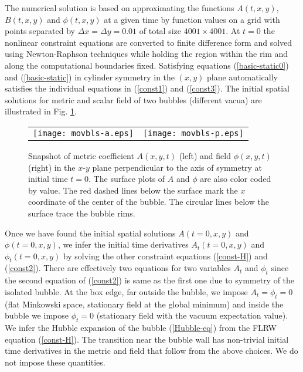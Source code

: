 \documentclass[preprintnumbers,eqsecnum,aps,prd,epsf,showpacs,nofootinbib
]{revtex4}
\begin{document}
The numerical solution is based on approximating the functions
$A(t,x,y)$, $B(t,x,y)$ and $\phi(t,x,y)$ at a given time by function
values on a grid with points separated by $\Delta x=\Delta y=0.01$ of
total size $4001 \times 4001$.  At $t=0$ the nonlinear constraint
equations are converted to finite difference form and solved using
Newton-Raphson techniques while holding the region within the rim and
along the computational boundaries fixed. Satisfying equations
(\ref{basic-static0}) and (\ref{basic-static}) in cylinder symmetry in
the $(x,y)$ plane automatically satisfies the individual equations in
(\ref{const1}) and (\ref{const3}). The initial spatial solutions for
metric and scalar field of two bubbles (different vacua) are
illustrated in Fig. \ref{fig-nonbst3}.
\begin{figure}[htbp]
\begin{center}
\begin{tabular}{ll}
\texttt{[image: movbls-a.eps]} &
\hspace{0.5cm}
\texttt{[image: movbls-p.eps]}
\end{tabular}
\end{center}
\caption{Snapshot of metric coefficient $A(x,y,t)$ (left) and field
  $\phi(x,y,t)$ (right) in the $x$-$y$ plane perpendicular to the axis
  of symmetry at initial time $t=0$. The surface plots of $A$ and
  $\phi$ are also color coded by value.  The red dashed lines below
  the surface mark the $x$ coordinate of the center of the bubble.
  The circular lines below the surface trace the bubble rims.
}
\label{fig-nonbst3}
\end{figure}

Once we have found the initial spatial solutions $A(t=0,x,y)$ and
$\phi(t=0,x,y)$, we infer the initial time derivatives $A_t(t=0,x,y)$
and $\phi_t(t=0,x,y)$ by solving the other constraint equations
(\ref{const-H}) and (\ref{const2}).  There are effectively two
equations for two variables $A_t$ and $\phi_t$ since the second
equation of (\ref{const2}) is same as the first one due to symmetry of
the isolated bubble. At the box edge, far outside the bubble, we
impose $A_t=\phi_t=0$ (flat Minkowski space, stationary field at the
global minimum) and inside the bubble we impose $\phi_t=0$ (stationary
field with the vacuum expectation value). We infer the Hubble
expansion of the bubble (\ref{Hubble-eq}) from the FLRW equation
(\ref{const-H}). The transition near the bubble wall has
non-trivial initial time derivatives in the metric and field that
follow from the above choices. We do not impose
these quantities.
\end{document}
